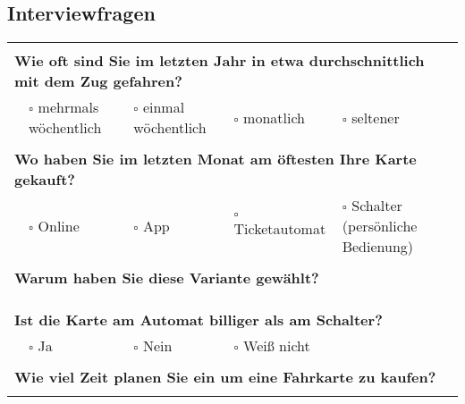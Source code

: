 \documentclass[]{article}
\begin{document}
\newpage
{}
\begin{landscape}

\section{Interviewfragen}
\label{sec:interviewfragen}

\begin{table}[h!]
	\large
	\begin{tabular}{|llllll|}
		\hline
		& & & & & \\
		\multicolumn{6}{|l|}{\textbf{Wie oft sind Sie im letzten Jahr in etwa durchschnittlich mit dem Zug gefahren?}}                      \\ \hline
		& $\square$ mehrmals wöchentlich & $\square$ einmal wöchentlich & $\square$ monatlich & $\square$ seltener &                        \\ \hline
		& & & & & \\
		\multicolumn{6}{|l|}{\textbf{Wo haben Sie im letzten Monat am öftesten Ihre Karte gekauft?}}                                        \\ \hline
		& $\square$ Online & $\square$ App & $\square$ Ticketautomat & \multicolumn{2}{l|}{$\square$ Schalter (persönliche Bedienung)}      \\ \hline
		& & & & & \\
		\multicolumn{6}{|l|}{\textbf{Warum haben Sie diese Variante gewählt?}}                                                              \\ \hline
		\multicolumn{6}{|l|}{}                                                                                                              \\
		& & & & & \\ \hline
		& & & & & \\
		\multicolumn{6}{|l|}{\textbf{Ist die Karte am Automat billiger als am Schalter?}}                                                   \\ \hline
		& $\square$ Ja & $\square$ Nein & $\square$ Weiß nicht &  &                                                                         \\ \hline
		& & & & & \\
		\multicolumn{6}{|l|}{\textbf{Wie viel Zeit planen Sie ein um eine Fahrkarte zu kaufen?}}                                            \\ \hline
		\multicolumn{6}{|l|}{}                                                                                                              \\

\end{tabular}
\end{table}
\end{landscape}
\end{document}
